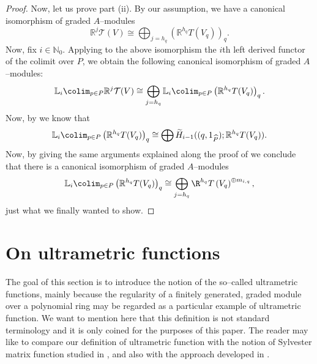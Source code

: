 \documentclass[11pt]{amsart}
\begin{document}
\begin{proof}
Now, let us prove part (ii). By our assumption, we have a canonical isomorphism of graded $A$--modules
\[
\mathbb{R}^j \mathcal{T} (V)\cong\bigoplus_{j=h_q} \left(\mathbb{R}^{h_q} T (V_q)\right)_q.
\]
Now, fix $i\in\mathbb{N}_0$. Applying to the above isomorphism the $i$th left derived functor of the colimit over $P$, we obtain the following canonical isomorphism of graded $A$--modules:
\[
\mathbb{L}_i \colim_{p\in P} \mathbb{R}^j \mathcal{T} (V)\cong\bigoplus_{j=h_q} \mathbb{L}_i \colim_{p\in P}\left(\mathbb{R}^{h_q} T (V_q)\right)_q.
\]
Now, by \cite[Lemma 4.10]{AlvarezBoixZarzuelaspectralsequences} we know that
\[
\mathbb{L}_i \colim_{p\in P}\left(\mathbb{R}^{h_q} T (V_q)\right)_q\cong\bigoplus\widetilde{H}_{i-1} ((q,1_{\widehat{P}}); \mathbb{R}^{h_q} T (V_q)).
\]
Now, by giving the same arguments explained along the proof of \cite[Theorem 4.11]{AlvarezBoixZarzuelaspectralsequences} we conclude that there is a canonical isomorphism of graded $A$--modules
\[
\mathbb{L}_i \colim_{p\in P}\left(\mathbb{R}^{h_q} T (V_q)\right)_q\cong\bigoplus_{j=h_q} \R^{h_q} T \left(V_q\right)^{\oplus m_{i,q}},
\]
just what we finally wanted to show.
\end{proof}


\section{On ultrametric functions}\label{section on ultrametric functions}

The goal of this section is to introduce the notion of the so--called ultrametric functions, mainly because the regularity of a finitely generated, graded module over a polynomial ring may be regarded as a particular example of ultrametric function. We want to mention here that this definition is not standard terminology and it is only coined for the purposes of this paper. The reader may like to compare our definition of ultrametric function with the notion of Sylvester matrix function studied in \cite{Virilirankfunctions}, and also with the approach developed in \cite[Lemma 2.1]{Santoni}.
\end{document}
